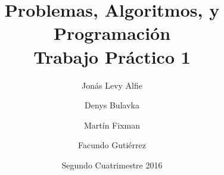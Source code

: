 \documentclass{article}
\title{Problemas, Algoritmos, y Programación \\ Trabajo Práctico 1}
\author{Jonás Levy Alfie \and Denys Bulavka \and Martín Fixman \and Facundo Gutiérrez}
\date{Segundo Cuatrimestre 2016}
\begin{document}
\maketitle{}

\newpage
\tableofcontents





\end{document}
